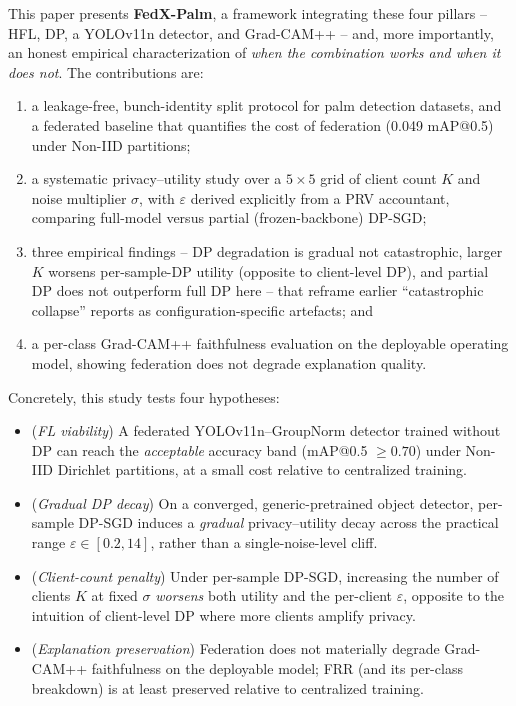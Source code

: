 \documentclass[twocolumn,a4paper,10pt]{article}
\begin{document}
This paper presents \textbf{FedX-Palm}, a framework integrating these four
pillars -- HFL, DP, a YOLOv11n detector, and Grad-CAM++ -- and, more
importantly, an honest empirical characterization of \emph{when the combination
works and when it does not}. The contributions are:
\begin{enumerate}
\item a leakage-free, bunch-identity split protocol for palm detection datasets,
and a federated baseline that quantifies the cost of federation (0.049 mAP@0.5)
under Non-IID partitions;
\item a systematic privacy--utility study over a $5 \times 5$ grid of client
count $K$ and noise multiplier $\sigma$, with $\varepsilon$ derived explicitly
from a PRV accountant, comparing full-model versus partial (frozen-backbone)
DP-SGD;
\item three empirical findings -- DP degradation is gradual not catastrophic,
larger $K$ worsens per-sample-DP utility (opposite to client-level DP), and
partial DP does not outperform full DP here -- that reframe earlier
``catastrophic collapse'' reports as configuration-specific artefacts; and
\item a per-class Grad-CAM++ faithfulness evaluation on the deployable operating
model, showing federation does not degrade explanation quality.
\end{enumerate}

Concretely, this study tests four hypotheses:
\begin{itemize}
\item[\textbf{H1}] (\emph{FL viability}) A federated YOLOv11n--GroupNorm
detector trained without DP can reach the \emph{acceptable} accuracy band
(mAP@0.5 $\geq 0.70$) under Non-IID Dirichlet partitions, at a small cost
relative to centralized training.
\item[\textbf{H2}] (\emph{Gradual DP decay}) On a converged, generic-pretrained
object detector, per-sample DP-SGD induces a \emph{gradual} privacy--utility
decay across the practical range $\varepsilon \in [0.2, 14]$, rather than a
single-noise-level cliff.
\item[\textbf{H2-K}] (\emph{Client-count penalty}) Under per-sample DP-SGD,
increasing the number of clients $K$ at fixed $\sigma$ \emph{worsens} both
utility and the per-client $\varepsilon$, opposite to the intuition of
client-level DP where more clients amplify privacy.
\item[\textbf{H3}] (\emph{Explanation preservation}) Federation does not
materially degrade Grad-CAM++ faithfulness on the deployable model; FRR (and
its per-class breakdown) is at least preserved relative to centralized
training.
\end{itemize}
\end{document}
